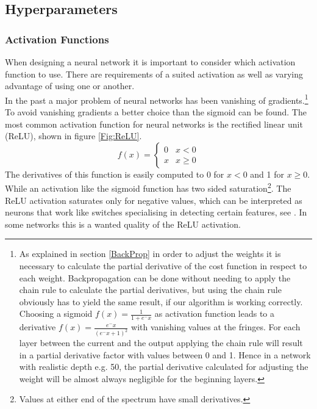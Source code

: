 		\subsection{Hyperparameters}
			\label{HyperPar}
			\subsubsection{Activation Functions}
				\label{Sec:Activation}
				When designing a neural network it is important to consider which activation function to use. There are requirements of a suited activation as well as varying advantage of using one or another.\\
				In the past a major problem of neural networks has been vanishing of gradients.\footnote{
				As explained in section \ref{BackProp} in order to adjust the weights it is necessary to calculate the partial derivative of the cost function in respect to each weight. Backpropagation can be done without needing to apply the chain rule to calculate the partial derivatives, but using the chain rule obviously has to yield the same result, if our algorithm is working correctly.\\
				Choosing a sigmoid $f(x)=\frac{1}{1+e^-x}$ as activation function leads to a derivative $f(x)=\frac{e^-x}{(e^-x+1)^2}$ with vanishing values at the fringes. For each layer between the current and the output applying the chain rule will result in a partial derivative factor with values between 0 and 1. Hence in a network with realistic depth e.g. 50, the partial derivative calculated for adjusting the weight will be almost always negligible for the beginning layers.}\\
				To avoid vanishing gradients a better choice than the sigmoid can be found. The most common activation function for neural networks is the rectified linear unit (ReLU), shown in figure \ref{Fig:ReLU}.
				\begin{equation}
					f(x) =
					\begin{cases}
						0 & x < 0\\
						x & x \geq 0
					\end{cases}
					\label{EQ:ReLU}
				\end{equation}
				The derivatives of this function is easily computed to 0 for $ x < 0$ and 1 for $ x \geq 0$. While an activation like the sigmoid function has two sided saturation\footnote{Values at either end of the spectrum have small derivatives.}. The ReLU activation saturates only for negative values, which can be interpreted as neurons that work like switches specialising in detecting certain features, see \cite{VanGrad}. In some networks this is a wanted quality of the ReLU activation.\\
